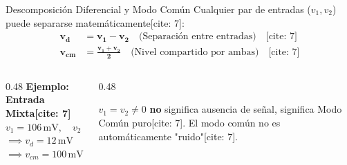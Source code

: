 \documentclass[aspectratio=169]{beamer}
\begin{document}
\begin{frame}{Descomposición Diferencial y Modo Común}
    Cualquier par de entradas ($v_1, v_2$) puede separarse matemáticamente[cite: 7]:
    \begin{align*}
        \mathbf{v_d} &= \mathbf{v_1 - v_2} \quad \text{(Separación entre entradas)} \quad \text{[cite: 7]} \\
        \mathbf{v_{cm}} &= \mathbf{\frac{v_1 + v_2}{2}} \quad \text{(Nivel compartido por ambas)} \quad \text{[cite: 7]}
    \end{align*}
    
    \vspace{0.1cm}
    \begin{columns}[c]
        \begin{column}{0.48\textwidth}
            \textbf{Ejemplo: Entrada Mixta[cite: 7]} \\
            $v_1 = 106\,\text{mV}, \quad v_2 = 94\,\text{mV}$ \\
            $\implies v_d = 12\,\text{mV}$ \\
            $\implies v_{cm} = 100\,\text{mV}$
        \end{column}
        \begin{column}{0.48\textwidth}
            \begin{tcolorbox}[colback=yellow!10, colframe=orange, title=Nota Conceptual]
                $v_1 = v_2 \neq 0$ \textbf{no} significa ausencia de señal, significa Modo Común puro[cite: 7]. El modo común no es automáticamente "ruido"[cite: 7].
            \end{tcolorbox}
        \end{column}
    \end{columns}
\end{frame}
\end{document}
